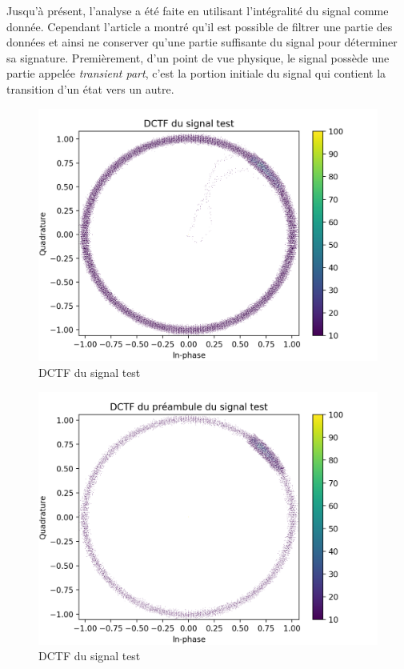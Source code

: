 \vspace{0.1cm}

Jusqu'à présent, l'analyse a été faite en utilisant l'intégralité du signal comme donnée. Cependant l'article \cite{loraDCTF} a montré qu'il est possible de filtrer une partie des données et ainsi ne conserver qu'une partie suffisante du signal pour déterminer sa signature. Premièrement, d'un point de vue physique, le signal possède une partie appelée \textit{transient part}, c'est la portion initiale du signal qui contient la transition d'un état vers un autre.

\newpage

\begin{figure}[h]
\centering

\includegraphics[scale=0.3]{images/dctf4.png}
\caption{DCTF du signal test}\label{term317}
\end{figure}

\begin{figure}[h]
\centering

\includegraphics[scale=0.3]{images/dctf5.png}
\caption{DCTF du signal test}\label{term318}
\end{figure}

